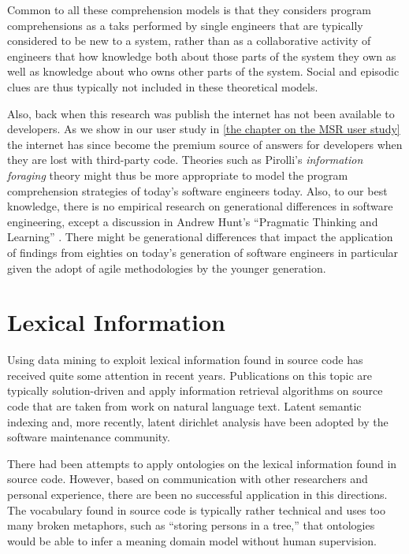 Common to all these comprehension models is that they considers program comprehensions as a taks performed by single engineers that are typically considered to be new to a system, rather than as a collaborative activity of engineers that how knowledge both about those parts of the system they own as well as knowledge about who owns other parts of the system. Social and episodic clues are thus typically not included in these theoretical models.

Also, back when this research was publish the internet has not been available to developers. As we show in our user study in \autoref{the chapter on the MSR user study} the internet has since become the premium source of answers for developers when they are lost with third-party code. Theories such as Pirolli's \emph{information foraging} theory \cite{InfoForage} might thus be more appropriate to model the program comprehension strategies of today's software engineers today. Also, to our best knowledge, there is no empirical research on generational differences in software engineering, except a discussion in Andrew Hunt's ``Pragmatic Thinking and Learning'' \cite{Hunt08a}. There might be generational differences that impact the application of findings from eighties on today's generation of software engineers in particular given the adopt of agile methodologies by the younger generation.

\section{Lexical Information}

Using data mining to exploit lexical information found in source code has received quite some attention in recent years. Publications on this topic are typically solution-driven and apply information retrieval algorithms on source code that are taken from work on natural language text. Latent semantic indexing \cite{Deer90a} and, more recently, latent dirichlet analysis \cite{Bald08a} have been adopted by the software maintenance community. 

There had been attempts to apply ontologies on the lexical information found in source code. However, based on communication with other researchers and personal experience, there are been no successful application in this directions. The vocabulary found in source code is typically rather technical and uses too many broken metaphors, such as ``storing persons in a tree,'' that ontologies would be able to infer a meaning domain model without human supervision.

